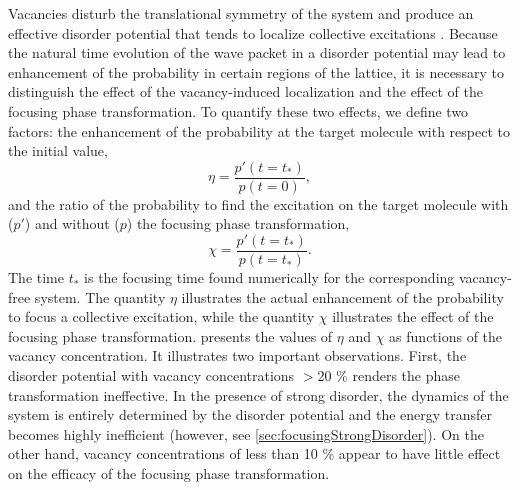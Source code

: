 Vacancies disturb the translational symmetry of the system and produce an effective disorder potential that tends to
localize collective excitations \cite{perez-rios2010}.
 Because the natural time evolution of the wave packet in a disorder potential may lead to enhancement of the probability in certain
regions of the lattice, it is necessary to distinguish the effect of the vacancy-induced localization and the effect of the focusing phase
transformation. To quantify these two effects, we define two factors:
the enhancement of the probability at the target molecule with respect to the initial value,
\begin{equation}
\eta = \frac{p' (t=t_{\ast})}{p(t=0)},
\label{eta}
\end{equation}
and the ratio of the probability to find the excitation on the target molecule with ($p'$) and without ($p$) the focusing
phase transformation,
\begin{equation}
\chi = \frac{p' (t=t_{{\ast}})}{p (t=t_{ {\ast}})}.
\end{equation}
The time $t_*$ is the focusing time found numerically for the corresponding vacancy-free system.
 The quantity $\eta$ illustrates the actual enhancement of the probability to focus a collective excitation,
while the quantity $\chi$ illustrates the effect of the focusing phase transformation.
 presents the values of $\eta$ and $\chi$ as functions of the vacancy concentration.
It illustrates two important observations. First, the disorder potential with vacancy concentrations $> 20$ \%
renders the phase transformation ineffective. In the presence of strong disorder, the dynamics of the system is entirely
determined by the disorder potential and the energy transfer becomes highly inefficient (however, see \autoref{sec:focusingStrongDisorder}). On the other hand, vacancy
concentrations of less than 10 \% appear to have little effect on the efficacy of the focusing phase transformation.

